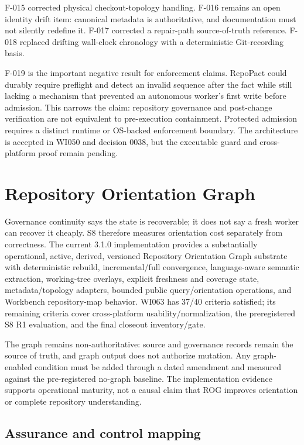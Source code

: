 \documentclass[11pt]{article}
\begin{document}
F-015 corrected physical checkout-topology handling. F-016 remains an open identity drift
item: canonical metadata is authoritative, and documentation must not silently redefine it.
F-017 corrected a repair-path source-of-truth reference. F-018 replaced drifting wall-clock
chronology with a deterministic Git-recording basis.

F-019 is the important negative result for enforcement claims. RepoPact could durably
require preflight and detect an invalid sequence after the fact while still lacking a
mechanism that prevented an autonomous worker's first write before admission. This narrows
the claim: repository governance and post-change verification are not equivalent to
pre-execution containment. Protected admission requires a distinct runtime or OS-backed
enforcement boundary. The architecture is accepted in WI050 and decision 0038, but the
executable guard and cross-platform proof remain pending.

\section{Repository Orientation Graph}

Governance continuity says the state is recoverable; it does not say a fresh worker can
recover it cheaply. S8 therefore measures orientation cost separately from correctness.
The current 3.1.0 implementation provides a substantially operational, active, derived,
versioned Repository Orientation Graph substrate with deterministic rebuild, incremental/full
convergence, language-aware semantic extraction, working-tree overlays, explicit freshness
and coverage state, metadata/topology adapters, bounded public query/orientation operations,
and Workbench repository-map behavior. WI063 has 37/40 criteria satisfied; its remaining
criteria cover cross-platform usability/normalization, the preregistered S8 R1 evaluation,
and the final closeout inventory/gate.

The graph remains non-authoritative: source and governance records remain the source of
truth, and graph output does not authorize mutation. Any graph-enabled condition must be
added through a dated amendment and measured against the pre-registered no-graph baseline.
The implementation evidence supports operational maturity, not a causal claim that ROG
improves orientation or complete repository understanding.

\subsection{Assurance and control mapping}
\end{document}
